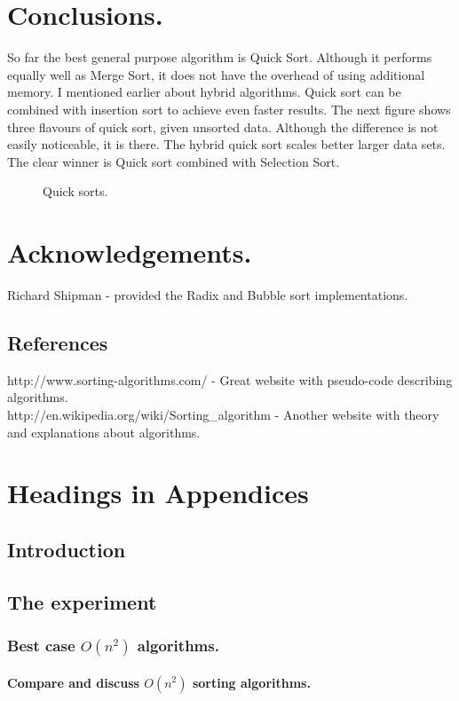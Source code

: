 \documentclass{acm_proc_article-sp}
\begin{document}
\section{Conclusions. }
So far the best general purpose algorithm is Quick Sort. Although it performs equally well as Merge Sort, it does not have the overhead of using additional memory. I mentioned earlier about hybrid algorithms. Quick sort can be combined with insertion sort to achieve even faster results. The next figure shows three flavours of quick sort, given unsorted data. Although the difference is not easily noticeable, it is there. The hybrid quick sort scales better larger data sets. The clear winner is Quick sort combined with Selection Sort.
\begin{figure}[!htb]
\caption{Quick sorts.}
\end{figure}

 
\appendix
\section{Acknowledgements.}
Richard Shipman - provided the Radix and Bubble sort implementations.
\subsection{References}
http://www.sorting-algorithms.com/ - Great website with pseudo-code describing algorithms. \\

http://en.wikipedia.org/wiki/Sorting\_algorithm  - Another website with theory and explanations about algorithms. \\

\section{Headings in Appendices}
\subsection{Introduction}
\subsection{The experiment}
\subsubsection{Best case $O(n^2)$ algorithms.}
\paragraph{Compare and discuss $O(n^2)$ sorting algorithms. }
\end{document}
